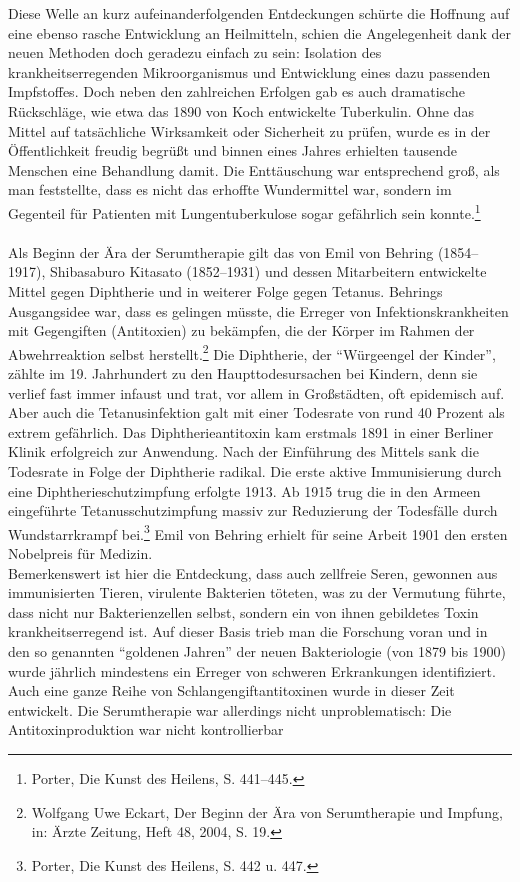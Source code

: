 \documentclass[
    a4paper,
    12pt,
    hyphens,
    chapterprefix=true,
    headheight=33pt,
    footheight=29pt,
    headings=optiontohead, %
]{scrartcl}
\begin{document}
Diese Welle an kurz aufeinanderfolgenden Entdeckungen schürte die Hoffnung auf eine ebenso rasche Entwicklung an Heilmitteln, schien die Angelegenheit dank der neuen Methoden doch geradezu einfach zu sein: Isolation des krankheitserregenden Mikroorganismus und Entwicklung eines dazu passenden Impfstoffes. Doch neben den zahlreichen Erfolgen gab es auch dramatische Rückschläge, wie etwa das 1890 von Koch entwickelte Tuberkulin. Ohne das Mittel auf tatsächliche Wirksamkeit oder Sicherheit zu prüfen, wurde es in der Öffentlichkeit freudig begrüßt und binnen eines Jahres erhielten tausende Menschen eine Behandlung damit. Die Enttäuschung war entsprechend groß, als man feststellte, dass es nicht das erhoffte Wundermittel war, sondern im Gegenteil für Patienten mit Lungentuberkulose sogar gefährlich sein konnte.\footnote{Porter, Die Kunst des Heilens, S. 441--445.}\\
\\
Als Beginn der Ära der Serumtherapie gilt das von Emil von Behring (1854--1917), Shibasaburo Kitasato (1852--1931) und
dessen Mitarbeitern entwickelte Mittel gegen Diphtherie und in weiterer Folge gegen Tetanus. Behrings Ausgangsidee war,
dass es gelingen müsste, die Erreger von Infektionskrankheiten mit Gegengiften (Antitoxien) zu bekämpfen, die der Körper
im Rahmen der Abwehrreaktion selbst herstellt.\footnote{Wolfgang Uwe Eckart, Der Beginn der Ära von Serumtherapie und Impfung,
in: Ärzte Zeitung, Heft 48, 2004, S. 19.} Die Diphtherie, der "`Würgeengel der Kinder"', zählte im 19. Jahrhundert zu den Haupttodesursachen
bei Kindern, denn sie verlief fast immer infaust und trat, vor allem in Großstädten, oft epidemisch auf.
Aber auch die Tetanusinfektion galt mit einer Todesrate von rund 40 Prozent
als extrem gefährlich. Das Diphtherieantitoxin kam erstmals 1891 in einer Berliner Klinik erfolgreich zur Anwendung.
Nach der Einführung des Mittels sank die Todesrate in Folge der Diphtherie radikal.
Die erste aktive Immunisierung durch eine Diphtherieschutzimpfung erfolgte 1913. Ab 1915 trug die in den Armeen eingeführte
Tetanusschutzimpfung massiv zur Reduzierung der Todesfälle durch Wundstarrkrampf bei.\footnote{Porter, Die Kunst des Heilens,
S. 442 u. 447.} Emil von Behring erhielt für seine Arbeit 1901 den ersten Nobelpreis für Medizin.\\
Bemerkenswert ist hier die Entdeckung, dass auch zellfreie Seren, gewonnen aus immunisierten Tieren, virulente Bakterien töteten, was zu der Vermutung führte, dass nicht nur Bakterienzellen selbst, sondern ein von ihnen gebildetes Toxin krankheitserregend ist. Auf dieser Basis trieb man die Forschung voran und in den so genannten "`goldenen Jahren"' der neuen Bakteriologie (von 1879 bis 1900) wurde jährlich mindestens ein Erreger von schweren Erkrankungen identifiziert. Auch eine ganze Reihe von Schlangengiftantitoxinen wurde in dieser Zeit entwickelt. Die Serumtherapie war allerdings nicht unproblematisch: Die Antitoxinproduktion war nicht kontrollierbar
\end{document}
